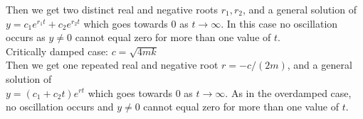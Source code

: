\documentclass{ximera}
\begin{document}
 Then we get two distinct real and negative roots $r_{1},r_{2}$,  and a general solution of \\ $y=c_{1}e^{r_{1}t}+c_{2}e^{r_{2}t}$ which goes towards $0$ as $t\rightarrow\infty$.   In this case no oscillation occurs as $y\neq 0$ cannot equal zero for more than one value of $t$.\\


 Critically damped case: $c=\sqrt{4mk}$\\

 Then we get one repeated real and negative root $r=-c/(2m)$, and a general solution of \\ $y=(c_{1}+c_{2}t)e^{rt}$ which goes towards $0$ as $t\rightarrow\infty$.  As in the overdamped case, no oscillation occurs and $y\neq 0$ cannot equal zero for more than one value of $t$.
\end{document}
